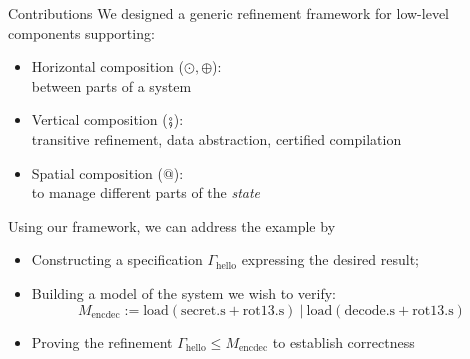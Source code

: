 \documentclass[aspectratio=1610,mathserif]{beamer}
\newcommand{\kw}[1]{\ensuremath{ \mathrm{#1} }}
\begin{document}
\begin{frame}{Contributions} %
  We designed a generic refinement framework for low-level components supporting:
  \begin{itemize}
    \item Horizontal composition ($\odot, \oplus$): \\
      between parts of a system
    \pause
    \item Vertical composition ($\fatsemi$): \\
      transitive refinement, data abstraction, certified compilation
    \pause
    \item Spatial composition ($\mathbin@$): \\
      to manage different parts of the \emph{state}
  \end{itemize}

  \pause \vfill
  Using our framework,
  we can address the example by \pause
  \begin{itemize}
    \item Constructing a specification $\Gamma_\kw{hello}$
      expressing the desired result;
    \pause
    \item Building a model of the system we wish to verify:
      \[
        M_\kw{encdec} :=
        \kw{load}(\kw{secret.s} + \kw{rot13.s})
        \:\mathbin{\mathtt{|}}\:
        \kw{load}(\kw{decode.s} + \kw{rot13.s})
      \]

    \pause
    \item Proving the refinement
      $
        \Gamma_\kw{hello} \le
        M_\kw{encdec}
      $
      to establish correctness
  \end{itemize}

%
\end{frame}
\end{document}
